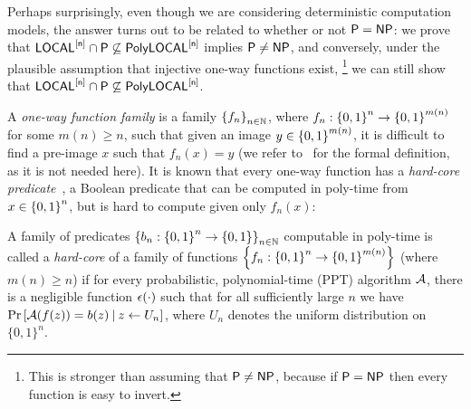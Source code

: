 Perhaps surprisingly,
even though we are considering deterministic computation models,
the answer turns out to be related to whether or not ${\mathsf{P}} = {\mathsf{NP}}$:
we prove that
${\mathsf{LOCAL}}^{[\mathsf{n}]} \cap {\mathsf{P}} \not \subseteq \mathsf{PolyLOCAL}^{[\mathsf{n}]}$ implies ${\mathsf{P}} \neq {\mathsf{NP}}$,
and conversely, under the plausible assumption that injective one-way functions exist,%
\footnote{This is stronger than assuming that ${\mathsf{P}} \neq {\mathsf{NP}}$,
because if ${\mathsf{P}} = {\mathsf{NP}}$ then every function is easy to invert.}
we can still show that 
${\mathsf{LOCAL}}^{[\mathsf{n}]} \cap {\mathsf{P}} \not \subseteq \mathsf{PolyLOCAL}^{[\mathsf{n}]}$.

A \emph{one-way function family} is a family $\left \{{ f_n } \right \}_{n \in \mathbb{N}}$,
where $f_n : \left \{{0,1} \right \}^n \rightarrow \left \{{0,1} \right \}^{m(n)}$ for some $m(n) \geq n$,
such that given an image $y \in \left \{{0,1} \right \}^{m(n)}$,
it is difficult to find a pre-image $x$ such that $f_n(x) = y$ (we refer to~\cite{OdedBook} for the formal definition,
as it is not needed here).
It is known that every one-way function has a \emph{hard-core predicate}~\cite{GL89},
a Boolean predicate that can be computed in poly-time from $x \in \left \{{0,1} \right \}^n$,
but is hard to compute given only $f_n(x)$:
\begin{definition}\label{def:HCP}
	A family of predicates %
 $ \left \{{ b_n : \left \{{0,1} \right \}^n \rightarrow \left \{{0,1} \right \}} \right \}_{n \in \mathbb{N}}$
computable in poly-time
 is called a \emph{hard-core} of a
	family of functions $\left \{{ f_n : \left \{{0,1} \right \}^n \rightarrow \left \{{0,1} \right \}^{m(n)}} \right \}$ (where $m(n) \geq n$)
	if for every probabilistic, polynomial-time (PPT) algorithm $\mathcal{A}$, there is a negligible function $\epsilon(\cdot)$ such that
	for all sufficiently large $n$ we have
	$\Pr\left[ \mathcal{A}( f(z) ) = b(z) \medspace | \medspace z \leftarrow U_n \right]$,
where $U_n$ denotes the uniform distribution on $\{0,1\}^n$.
\end{definition}

